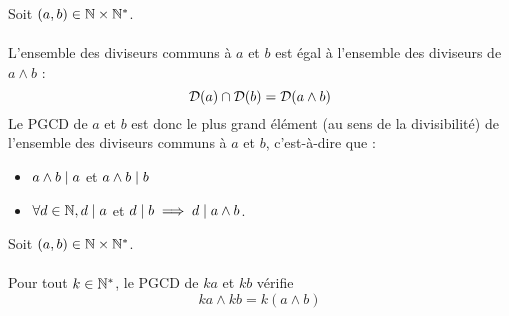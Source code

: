 \begin{defprop}
    Soit \((a, b) \in \mathbb{N} \times \mathbb{N}^*\).\\~\\
    L’ensemble des diviseurs communs à \(a\) et \(b\) est égal à l’ensemble des diviseurs de \(a \wedge b\) :
    \[\mathcal{D}(a) \cap \mathcal{D}(b) = \mathcal{D}(a \wedge b)\]
    Le PGCD de \(a\) et \(b\) est donc le plus grand élément (au sens de la divisibilité) de l’ensemble des diviseurs communs à \(a\) et \(b\), c’est-à-dire que :
    \begin{itemize}
        \item \(a \wedge b \mid a\) et \(a \wedge b \mid b\)
        \item\( \forall d \in \mathbb{N}, d \mid a\) et \( d \mid b \implies d \mid a \wedge b\).
    \end{itemize} 
\end{defprop}

\begin{defprop} 
    Soit \((a, b) \in \mathbb{N} \times \mathbb{N}^*\).\\~\\
    Pour tout \(k \in \mathbb{N}^*\), le PGCD de \(ka\) et \(kb\) vérifie
    \[ka \wedge kb = k (a \wedge b)\]
\end{defprop}

